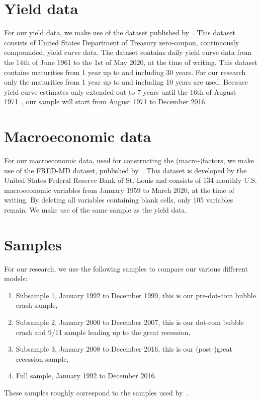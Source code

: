 \section{Yield data}
For our yield data, we make use of the dataset published by~\textcite{gurkaynak_us_2007}. 
This dataset consists of United States Department of Treasury zero-coupon, continuously compounded, yield curve data. 
The dataset contains daily yield curve data from the 14th of June 1961 to the 1st of May 2020, at the time of writing. 
This dataset contains maturities from 1 year up to and including 30 years. 
For our research only the maturities from 1 year up to and including 10 years are used. 
Because yield curve estimates only extended out to 7 years until the 16th of August 1971~\parencite[see][p.~19]{gurkaynak_us_2007}, our sample will start from August 1971 to December 2016. 

\section{Macroeconomic data}
For our macroeconomic data, used for constructing the (macro-)factors, we make use of the FRED-MD dataset, published by~\textcite{mccracken_fred-md_2016}. 
This dataset is developed by the United States Federal Reserve Bank of St. Louis and consists of 134 monthly U.S. macroeconomic variables from January 1959 to March 2020, at the time of writing. 
By deleting all variables containing blank cells, only 105 variables remain. 
We make use of the same sample as the yield data.

\section{Samples}
For our research, we use the following samples to compare our various different models:
\begin{enumerate}
	\item Subsample 1, January 1992 to December 1999, this is our pre-dot-com bubble crash sample,
	\item Subsample 2, January 2000 to December 2007, this is our dot-com bubble crash and 9/11 sample leading up to the great recession,
	\item Subsample 3, January 2008 to December 2016, this is our (post-)great recession sample,
	\item Full sample, January 1992 to December 2016.
\end{enumerate}
These samples roughly correspond to the samples used by~\textcite{swanson_big_2017}.